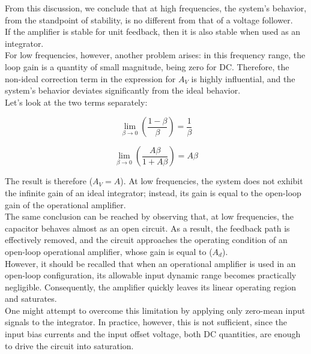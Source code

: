 \documentclass[../main.tex]{subfiles}
\begin{document}
From this discussion, we conclude that at high frequencies, the system’s behavior, from the standpoint of stability, is no different from that of a voltage follower.\\

If the amplifier is stable for unit feedback, then it is also stable when used as an integrator.\\


For low frequencies, however, another problem arises: in this frequency range, the loop gain is a quantity of small magnitude, being zero for DC. Therefore, the non-ideal correction term in the expression for $A_V$ is highly influential, and the system’s behavior deviates significantly from the ideal behavior.\\

Let's look at the two terms separately:

\begin{equation}
	\lim_{\beta \rightarrow 0} \left( \frac{1 - \beta}{\beta} \right) = \frac{1}{\beta}
\end{equation}

\begin{equation}
	\lim_{\beta \rightarrow 0} \left( \frac{A\beta}{1 + A\beta} \right) = A\beta
\end{equation}

The result is therefore ($A_V = A$). At low frequencies, the system does not exhibit the infinite gain of an ideal integrator; instead, its gain is equal to the open-loop gain of the operational amplifier.\\

The same conclusion can be reached by observing that, at low frequencies, the capacitor behaves almost as an open circuit. As a result, the feedback path is effectively removed, and the circuit approaches the operating condition of an open-loop operational amplifier, whose gain is equal to ($A_d$).\\

However, it should be recalled that when an operational amplifier is used in an open-loop configuration, its allowable input dynamic range becomes practically negligible. Consequently, the amplifier quickly leaves its linear operating region and saturates.\\

One might attempt to overcome this limitation by applying only zero-mean input signals to the integrator. In practice, however, this is not sufficient, since the input bias currents and the input offset voltage, both DC quantities, are enough to drive the circuit into saturation.\\
\end{document}
